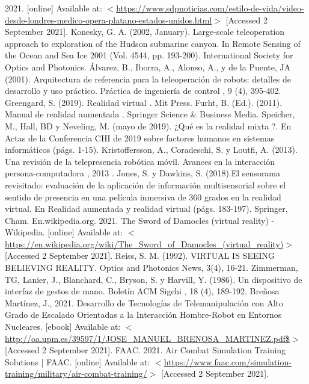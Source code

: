 \begin{thebibliography}{2}
	 2021. [online] Available at: $<$\href{https://www.sdpnoticias.com/estilo-de-vida/video-desde-londres-medico-opera-platano-estados-unidos.html}{https://www.sdpnoticias.com/estilo-de-vida/video-desde-londres-medico-opera-platano-estados-unidos.html}$>$ [Accessed 2 September 2021].
	 Konesky, G. A. (2002, January). Large-scale teleoperation approach to exploration of the Hudson submarine canyon. In Remote Sensing of the Ocean and Sea Ice 2001 (Vol. 4544, pp. 193-200). International Society for Optics and Photonics.
	 Álvarez, B., Iborra, A., Alonso, A., y de la Puente, JA (2001). Arquitectura de referencia para la teleoperación de robots: detalles de desarrollo y uso práctico. Práctica de ingeniería de control , 9 (4), 395-402.
	 Greengard, S. (2019). Realidad virtual . Mit Press.
	 Furht, B. (Ed.). (2011). Manual de realidad aumentada . Springer Science \& Business Media.
	 Speicher, M., Hall, BD y Neveling, M. (mayo de 2019). ¿Qué es la realidad mixta ?. En Actas de la Conferencia CHI de 2019 sobre factores humanos en sistemas informáticos (págs. 1-15).
	 Kristoffersson, A., Coradeschi, S. y Loutfi, A. (2013). Una revisión de la telepresencia robótica móvil. Avances en la interacción persona-computadora , 2013 .
	 Jones, S. y Dawkins, S. (2018).El sensorama revisitado: evaluación de la aplicación de información multisensorial sobre el sentido de presencia en una película inmersiva de 360 grados en la realidad virtual. En Realidad aumentada y realidad virtual (págs. 183-197). Springer, Cham.
	 En.wikipedia.org. 2021. The Sword of Damocles (virtual reality) - Wikipedia. [online] Available at: $<$\url{https://en.wikipedia.org/wiki/The\_Sword\_of\_Damocles\_(virtual\_reality)}$>$ [Accessed 2 September 2021].
	 Reiss, S. M. (1992). VIRTUAL IS SEEING BELIEVING REALITY. Optics and Photonics News, 3(4), 16-21.
	 Zimmerman, TG, Lanier, J., Blanchard, C., Bryson, S. y Harvill, Y. (1986). Un dispositivo de interfaz de gestos de mano. Boletín ACM Sigchi , 18 (4), 189-192.
	 Breñosa Martínez, J., 2021. Desarrollo de Tecnologías de Telemanipulación con Alto Grado de Escalado Orientadas a la Interacción Hombre-Robot en Entornos Nucleares. [ebook] Available at: $<$\url{http://oa.upm.es/39597/1/JOSE\_MANUEL\_BRENOSA\_MARTINEZ.pdf$}$>$ [Accessed 2 September 2021].
	 FAAC. 2021. Air Combat Simulation Training Solutions | FAAC. [online] Available at: $<$\url{https://www.faac.com/simulation-training/military/air-combat-training/}$>$ [Accessed 2 September 2021].

\end{thebibliography}
